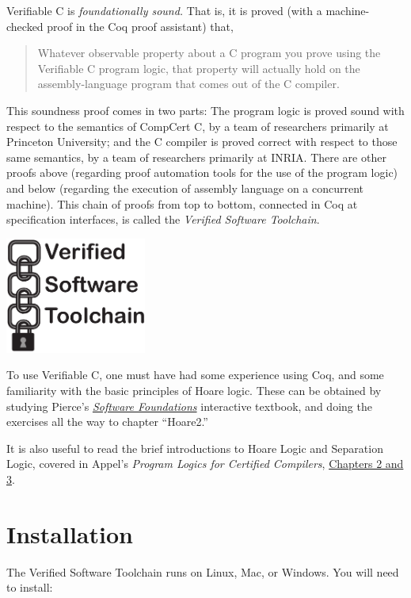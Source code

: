\documentclass[12pt,fleqn,openany,oneside,showtrims]{memoir}
\begin{document}
Verifiable C is \emph{foundationally sound.}  That is,
it is proved (with a machine-checked proof in the Coq proof assistant)
that,
\begin{quote}
  Whatever observable property about a C program you prove using the
  Verifiable C program logic, that property will actually hold on the
  assembly-language program that comes out of the C compiler.
\end{quote}
This soundness proof comes in two parts: The program logic
is proved sound with respect to the semantics of CompCert C,
by a team of researchers primarily at Princeton University;
and the C compiler is proved correct with respect to those same
semantics, by a team of researchers primarily at INRIA.
There are other proofs above (regarding proof automation
tools for the use of the program logic) and below
(regarding the execution of assembly language on
a concurrent machine).  This chain of proofs from top to
bottom, connected in Coq at specification interfaces,
is called the \emph{Verified Software Toolchain}.

\vfill

\centerline{\includegraphics[height=1.5in]{graphics/chain.pdf}}
\pagebreak
To use Verifiable C, one must have had some experience using
Coq, and some familiarity with the basic principles of Hoare logic.
These can be obtained by studying Pierce's
\href{https://www.cis.upenn.edu/~bcpierce/sf/}{\emph{Software Foundations}}
interactive textbook, and doing the exercises
all the way to chapter ``Hoare2.''

It is also useful to read the brief introductions to
Hoare Logic and Separation Logic,
covered in Appel's \emph{Program Logics for Certified Compilers},
\href{http://vst.cs.princeton.edu/download/PLCC-to-chapter-3.pdf#page=20}{Chapters 2 and 3}.

\chapter{Installation}

The Verified Software Toolchain runs on Linux, Mac, or Windows.
You will need to install:
\end{document}
